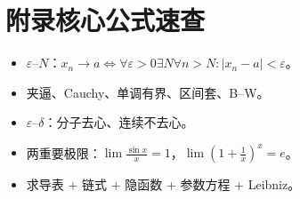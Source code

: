 \documentclass[11pt,a4paper,UTF8]{ctexart}
\newcommand{\eps}{\varepsilon}
\begin{document}
\section*{附录\quad 核心公式速查}
\begin{itemize}[leftmargin=1.5em]
\item $\eps$–$N$：$x_n\to a\iff\forall\eps>0\exists N\forall n>N:|x_n-a|<\eps$。
\item 夹逼、Cauchy、单调有界、区间套、B--W。
\item $\eps$–$\delta$：分子去心、连续不去心。
\item 两重要极限：$\lim\frac{\sin x}x=1$，$\lim(1+\frac1x)^x=e$。
\item 求导表 + 链式 + 隐函数 + 参数方程 + Leibniz。
\end{itemize}
\end{document}
